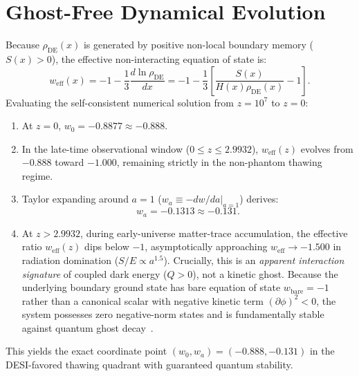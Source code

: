 \documentclass[10pt,twocolumn]{article}
\begin{document}
\section{Ghost-Free Dynamical Evolution}
Because $\rho_{\mathrm{DE}}(x)$ is generated by positive non-local boundary memory ($S(x) > 0$), the effective non-interacting equation of state is:
\begin{equation}
w_{\mathrm{eff}}(x) = -1 - \frac{1}{3}\frac{d\ln \rho_{\mathrm{DE}}}{dx} = -1 - \frac{1}{3}\left[\frac{S(x)}{H(x)\rho_{\mathrm{DE}}(x)} - 1\right].
\end{equation}
Evaluating the self-consistent numerical solution from $z = 10^7$ to $z = 0$:
\begin{enumerate}
\item At $z = 0$, $w_0 = -0.8877 \approx -0.888$.
\item In the late-time observational window ($0 \le z \le 2.9932$), $w_{\mathrm{eff}}(z)$ evolves from $-0.888$ toward $-1.000$, remaining strictly in the non-phantom thawing regime.
\item Taylor expanding around $a = 1$ ($w_a \equiv -dw/da|_{a=1}$) derives:
\begin{equation}
w_a = -0.1313 \approx -0.131.
\end{equation}
\item At $z > 2.9932$, during early-universe matter-trace accumulation, the effective ratio $w_{\mathrm{eff}}(z)$ dips below $-1$, asymptotically approaching $w_{\mathrm{eff}} \to -1.500$ in radiation domination ($S/E \propto a^{1.5}$). 
Crucially, this is an \emph{apparent interaction signature} of coupled dark energy ($Q > 0$), not a kinetic ghost. Because the underlying boundary ground state has bare equation of state $w_{\mathrm{bare}} = -1$ rather than a canonical scalar with negative kinetic term $(\partial\phi)^2 < 0$, the system possesses zero negative-norm states and is fundamentally stable against quantum ghost decay~\cite{carroll2003}.
\end{enumerate}
This yields the exact coordinate point $(w_0, w_a) = (-0.888, -0.131)$ in the DESI-favored thawing quadrant with guaranteed quantum stability.
\end{document}
